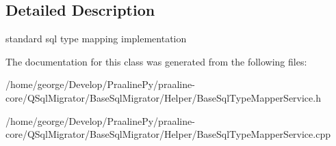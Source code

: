 \subsection{Detailed Description}
standard sql type mapping implementation 

The documentation for this class was generated from the following files\+:\begin{DoxyCompactItemize}
\item 
/home/george/\+Develop/\+Praaline\+Py/praaline-\/core/\+Q\+Sql\+Migrator/\+Base\+Sql\+Migrator/\+Helper/Base\+Sql\+Type\+Mapper\+Service.\+h\item 
/home/george/\+Develop/\+Praaline\+Py/praaline-\/core/\+Q\+Sql\+Migrator/\+Base\+Sql\+Migrator/\+Helper/Base\+Sql\+Type\+Mapper\+Service.\+cpp\end{DoxyCompactItemize}
